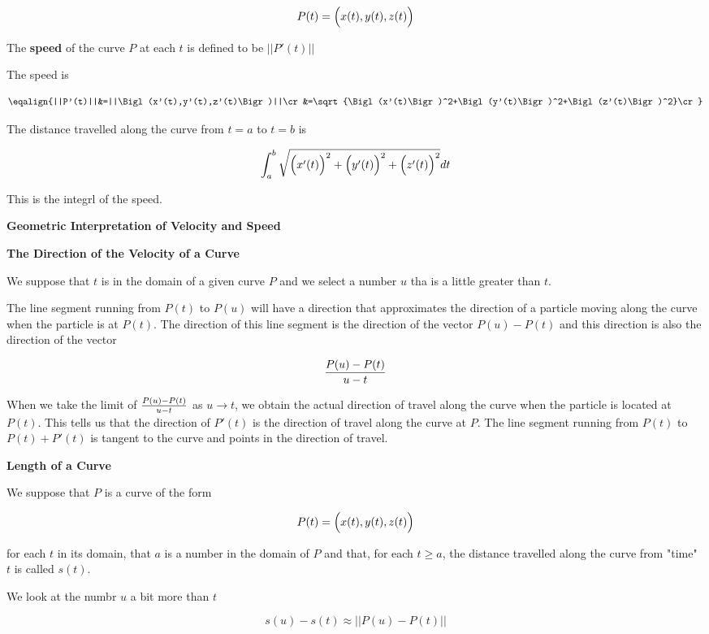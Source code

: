 $$P(t)=\Bigl(x(t),y(t),z(t)\Bigr)$$

The {\bf speed} of the curve $P$ at each $t$ is defined to be $||P'(t)||$

\vskip 1mm
The speed is

$$\eqalign{||P'(t)||&=||\Bigl(x'(t),y'(t),z'(t)\Bigr)||\cr
		&=\sqrt{\Bigl(x'(t)\Bigr)^2+\Bigl(y'(t)\Bigr)^2+\Bigl(z'(t)\Bigr)^2}\cr}$$

\vskip 1mm
The distance travelled along the curve from $t=a$ to $t=b$ is

$$\int_a^b\sqrt{\Bigl(x'(t)\Bigr)^2+\Bigl(y'(t)\Bigr)^2+\Bigl(z'(t)\Bigr)^2}dt$$

This is the integrl of the speed.

\filbreak
\vskip 1cm
{\bf Geometric Interpretation of Velocity and Speed}

\vskip 1mm
{\bf The Direction of the Velocity of a Curve}

\vskip 1mm
We suppose that $t$ is in the domain of a given curve $P$ and we select a number $u$ tha is a little greater than $t$.

\vskip 1mm
The line segment running from $P(t)$ to $P(u)$ will have a direction that approximates the direction of a particle moving along the curve when the particle is at $P(t)$. The direction of this line segment is the direction of the vector $P(u)-P(t)$ and this direction is also the direction of the vector

$${P(u)-P(t)\over u-t}$$

When we take the limit of ${P(u)-P(t)\over u-t}$ as $u\to t$, we obtain the actual direction of travel along the curve when the particle is located at $P(t)$. This tells us that the direction of $P'(t)$ is the direction of travel along the curve at $P$. The line segment running from $P(t)$ to $P(t)+P'(t)$ is tangent to the curve and points in the direction of travel.

\filbreak
\vskip 1cm
{\bf Length of a Curve}

\vskip 1mm
We suppose that $P$ is a curve of the form

$$P(t)=\Bigl(x(t),y(t),z(t)\Bigr)$$

for each $t$ in its domain, that $a$ is a number in the domain of $P$ and that, for each $t\geq a$, the distance travelled along the curve from "time" $t$ is called $s(t)$.

\vskip 1mm
We look at the numbr $u$ a bit more than $t$

$$s(u)-s(t)\approx ||P(u)-P(t)||$$


